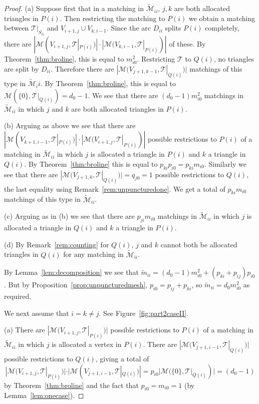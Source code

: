 \documentclass[a4paper]{amsart}
\begin{document}
\begin{proof}
(a) Suppose first that in a matching in $\widetilde{\mathcal M}_{ii}$,
$j,k$ are both allocated triangles in $P(i)$. Then
restricting the matching to $P(i)$ we obtain a matching between
${\mathcal T}|_{S_{ii}}$ and $V_{i+1,j}\cup V_{k,i-1}$.
Since the arc $D_{ii}$ splits $P(i)$ completely, there are
$|{\mathcal M}(V_{i+1,j},{\mathcal T}|_{P(i)})|\cdot |{\mathcal M}(V_{k,i-1},{\mathcal T}|_{P(i)})|$ of these.
By Theorem~\ref{thm:broline}, this is equal to $m_{i0}^2$. Restricting ${\mathcal T}$ to
$Q(i)$, no triangles are split by $D_{ii}$. Therefore there are
$|{\mathcal M}(V_{j+1,k-1},{\mathcal T}|_{Q(i)})|$ matchings of this type in $\widetilde{\mathcal M}_ii$.
By Theorem~\ref{thm:broline}, this is equal to ${\mathcal M}(\{0\},{\mathcal T}|_{Q(i)})=d_0-1$.
We see that there are $(d_0-1)m_{i0}^2$
matchings in $\widetilde{\mathcal M}_{ii}$ in which $j$ and $k$ are both allocated
triangles in $P(i)$.

(b) Arguing as above we see that there are
$|{\mathcal M}(V_{k+1,i-1},{\mathcal T}|_{P(i)})|\cdot |{\mathcal M}(V_{i+1,j},{\mathcal T}|_{P(i)})|$
possible restrictions to $P(i)$ of a matching in
$\widetilde{\mathcal M}_{ii}$ in which $j$ is allocated a triangle in $P(i)$ and $k$ a
triangle in $Q(i)$. By Theorem~\ref{thm:broline} this is equal to
$p_{ki}p_{i0}=p_{ki}m_{i0}$.
Similarly we see that there are $|{\mathcal M}(V_{j+1,k},{\mathcal T}|_{Q(i)})|=q_{j0}=1$
possible restrictions to $Q(i)$, the last equality using
Remark~\ref{rem:unpuncturedone}. We get a total of $p_{ki}m_{i0}$
matchings of this type in $\widetilde{\mathcal M}_{ii}$.

(c) Arguing as in (b) we see that there are $p_{ji}m_{i0}$ matchings in
$\widetilde{\mathcal M}_{ii}$ in which $j$ is allocated a triangle in $Q(i)$ and
$k$ a triangle in $P(i)$.

(d) By Remark~\ref{rem:counting} for $Q(i)$, $j$ and $k$ cannot both be
allocated triangles in $Q(i)$ for any matching in $\widetilde{\mathcal M}_{ii}$.

By Lemma~\ref{lem:decomposition} we see that
$\widetilde{m}_{ii}=(d_0-1)m_{i0}^2+(p_{ki}+p_{ij})p_{i0}$. But
by Proposition~\ref{prop:unpuncturedmesh}, $p_{i0}=p_{ij}+p_{ki}$, so
$\widetilde{m}_{ii}=d_0m_{i0}^2$ as required.

We next assume that $i=k\not=j$.
See Figure~\ref{fig:part2caseII}.

(a) There are $|{\mathcal M}(V_{i+1,j},{\mathcal T}|_{P(i)})|$ possible restrictions to $P(i)$
of a matching in $\widetilde{\mathcal M}_{ii}$ in which $j$ is allocated a vertex
in $P(i)$. There are $|{\mathcal M}(V_{j+1,i-1},{\mathcal T}|_{Q(i)})|$ possible
restrictions to $Q(i)$, giving a total of
$$|{\mathcal M}(V_{i+1,j},{\mathcal T}|_{P(i)})|\cdot |{\mathcal M}(V_{j+1,i-1},{\mathcal T}|_{Q(i)})|=p_{i0}
|{\mathcal M}(\{0\},{\mathcal T}|_{Q(i)})|=(d_0-1)$$
by Theorem~\ref{thm:broline} and the fact that $p_{i0}=m_{i0}=1$
(by Lemma~\ref{lem:onecase}).


\end{proof}
\end{document}
